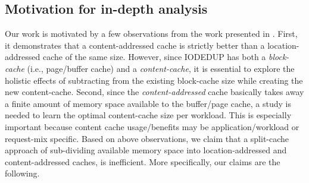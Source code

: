 \subsection{Motivation for in-depth analysis}
Our work is motivated by a few observations from the work
presented in \cite{iodedup}.
First, it demonstrates that a content-addressed cache
is strictly better than a location-addressed cache of the same size. However, since
IODEDUP has both a \textit{block-cache} (i.e., page/buffer cache)
and a \textit{content-cache}, it is
essential to explore the holistic effects of subtracting from the existing
block-cache size while creating the new content-cache.
Second, since the \textit{content-addressed} cache
basically takes away a finite amount of memory space available
to the buffer/page cache, a study is needed to learn the
optimal content-cache size per workload. This is especially important
because content cache usage/benefits may be application/workload
or request-mix specific.
Based on above observations, we claim
that a split-cache approach of sub-dividing available
memory space into location-addressed and content-addressed caches, is inefficient.
More specifically, our claims are the following.
